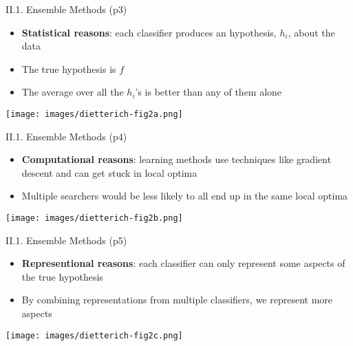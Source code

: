 \documentclass[handout]{beamer}
\newcommand{\strong}[1]{\textbf{\color{teal} #1}}
\begin{document}
\begin{frame}{II.1. Ensemble Methods (p3)}
\begin{itemize}
\item \strong{Statistical reasons}: each classifier produces an hypothesis, $h_i$, about the data
\item The true hypothesis is $f$
\item The average over all the $h_i$'s is better than any of them alone
\end{itemize}
\begin{center}
\texttt{[image: images/dietterich-fig2a.png]}
\end{center}
\end{frame}
\begin{frame}{II.1. Ensemble Methods (p4)}
\begin{itemize}
\item \strong{Computational reasons}: learning methods use techniques like gradient descent and can get stuck in local optima
\item Multiple searchers would be less likely to all end up in the same local optima
\end{itemize}
\begin{center}
\texttt{[image: images/dietterich-fig2b.png]}
\end{center}
\end{frame}
\begin{frame}{II.1. Ensemble Methods (p5)}
\begin{itemize}
\item \strong{Representional reasons}: each classifier can only represent some aspects of the true hypothesis
\item By combining representations from multiple classifiers, we represent more aspects
\end{itemize}
\begin{center}
\texttt{[image: images/dietterich-fig2c.png]}
\end{center}
\end{frame}
\end{document}
